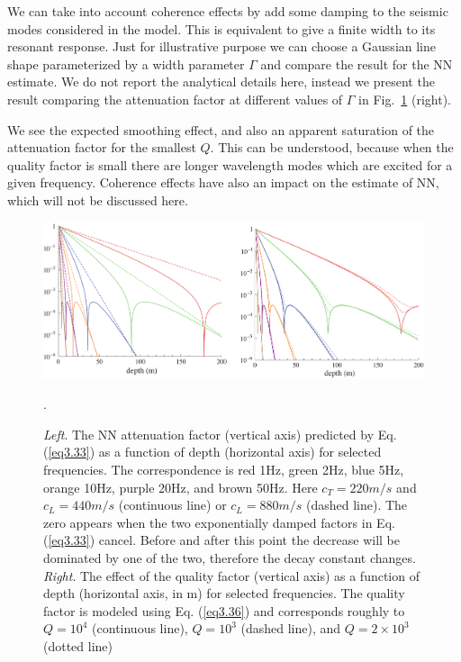 We can take into account coherence effects by add some damping to the seismic
modes considered in the model. This is equivalent to give a finite width to
its resonant response. Just for illustrative purpose we can choose a Gaussian
line shape parameterized by a width parameter $\Gamma$ and compare the result
for the NN estimate. We do not report the analytical details here, instead we
present the result comparing the attenuation factor at different values of
$\Gamma$ in Fig.~\ref{fig3.8} (right).

We see the expected smoothing effect, and also an apparent saturation of the
attenuation factor for the smallest $Q$. This can be understood, because when
the quality factor is small there are longer wavelength modes which are
excited for a given frequency. Coherence effects have also an impact on the
estimate of NN, which will not be discussed here.
\begin{figure}[t]
\begin{center} 
\includegraphics[width=16.5cm]{./Sec_SiteInfra/Figures/CellaNNTF.pdf} 
\caption{{\em Left}. The
		NN attenuation factor (vertical axis) predicted by
		Eq. (\ref{eq3.33}) as a function of depth (horizontal axis)
		for selected frequencies. The correspondence is red 1Hz, green
		2Hz, blue 5Hz, orange 10Hz, purple 20Hz, and brown 50Hz. Here
		$c_{T}=220m/s$ and $c_{L}=440m/s$ (continuous line) or
		$c_{L}=880m/s$ (dashed line). The zero appears when the two
		exponentially damped factors in Eq. (\ref{eq3.33})
		cancel. Before and after this point the decrease will be
		dominated by one of the two, therefore the decay constant
		changes. {\em Right}. The effect of the quality factor (vertical
		axis) as a function of depth (horizontal axis, in m) for
		selected frequencies. The quality factor is modeled using
		Eq. (\ref{eq3.36}) and corresponds roughly to $Q=10^{4}$
		(continuous line), $Q=10^{3}$ (dashed line), and
		$Q=2\times10^{3}$ (dotted line)}.  \label{fig3.8} \end{center}
\end{figure}
\FloatBarrier
